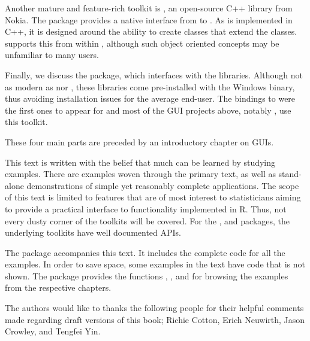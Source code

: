 Another mature and feature-rich toolkit is \Qt, an open-source C++ library
from Nokia. The \R\/ package  provides a native interface
from \R\/ to \Qt.  As \Qt\/ is implemented in C++, it is designed
around the ability to create classes that extend the \Qt\/
classes.  supports this from within \R\/, although such
object oriented concepts may be unfamiliar to many \R\/ users.

Finally, we discuss the  package, which interfaces with the
\TK\/ libraries. Although not as modern as \GTK\/ nor \Qt, these
libraries come pre-installed with the Windows binary, thus avoiding
installation issues for the average end-user. The bindings to \TK\/
were the first ones to appear for \R\/ and most of the GUI projects
above, notably , use this toolkit.

These four main parts are preceded by an introductory chapter on GUIs.

This text is written with the belief that much can be learned by
studying examples. There are examples woven through the primary text,
as well as stand-alone demonstrations of simple yet reasonably
complete applications. The scope of this text is limited to features
that are of most interest to statisticians aiming to provide a
practical interface to functionality implemented in R. Thus, not every
dusty corner of the toolkits will be covered. For the ,
 and  packages, the underlying toolkits have
well documented APIs.

The package \pkg{\PACKAGENAME} accompanies this text. It includes the
complete code for all the examples. In order to save space, some
examples in the text have code that is not shown. The package provides
the functions , ,
 and  for browsing the
examples from the respective chapters. 


The authors would like to thanks the following people for their 
helpful comments made regarding draft versions of this book; Richie
Cotton, Erich Neuwirth, Jason Crowley, and Tengfei Yin.



